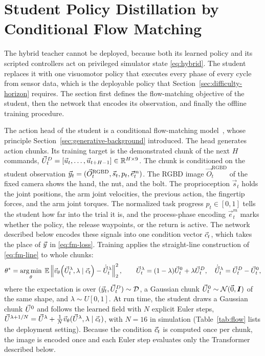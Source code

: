 \section{Student Policy Distillation by Conditional Flow Matching}\label{sec:distillation}

The hybrid teacher cannot be deployed, because both its learned policy and its scripted controllers act on privileged simulator state \eqref{eq:hybrid}. The student replaces it with one visuomotor policy that executes every phase of every cycle from sensor data, which is the deployable policy that Section~\ref{sec:difficulty-horizon} requires. The section first defines the flow-matching objective of the student, then the network that encodes its observation, and finally the offline training procedure.

The action head of the student is a conditional flow-matching model~\cite{Lipman2023,Lipman2024}, whose principle Section~\ref{sec:generative-background} introduced.
The head generates action chunks. Its training target is the demonstrated chunk of the next $H$ commands, $\vec{U}^{D}_t=[\vec{u}_t,\dots,\vec{u}_{t+H-1}]\in\mathbb{R}^{H\times9}$. The chunk is conditioned on the student observation $\vec{y}_t=(\vec{O}^{\mathrm{RGBD}}_t,\vec{s}_t,p_t,\vec{e}^{m}_t)$. The \acs{RGBD} image $\vec{O}^{\mathrm{RGBD}}_t$ of the fixed camera shows the hand, the nut, and the bolt. The proprioception $\vec{s}_t$ holds the joint positions, the arm joint velocities, the previous action, the fingertip forces, and the arm joint torques. The normalized task progress $p_t\in[0,1]$ tells the student how far into the trial it is, and the process-phase encoding $\vec{e}^{m}_t$ marks whether the policy, the release waypoints, or the return is active. The network described below encodes these signals into one condition vector $\vec{c}_t$, which takes the place of $\vec{y}$ in \eqref{eq:fm-loss}. Training applies the straight-line construction of \eqref{eq:fm-line} to whole chunks:
\begin{equation}\label{eq:student-objective}
  \theta^{*}=\argmin_\theta\;\E\left\|\vfield\!\left(\Uc^{\lambda}_t,\lambda\mid\cond_t\right)-\dot{\Uc}^{\lambda}_t\right\|_2^{2},\qquad
  \Uc^{\lambda}_t=(1-\lambda)\Uc^{0}_t+\lambda\Uc^{D}_t,\quad
  \dot{\Uc}^{\lambda}_t=\Uc^{D}_t-\Uc^{0}_t,
\end{equation}
where the expectation is over $(\vec{y}_t,\vec{U}^{D}_t)\sim\mathcal{D}$, a Gaussian chunk $\vec{U}^{0}_t\sim\mathcal{N}(\vec{0},\boldsymbol{I})$ of the same shape, and $\lambda\sim U[0,1]$. At run time, the student draws a Gaussian chunk $\vec{U}^{0}$ and follows the learned field with $N$ explicit Euler steps, $\vec{U}^{\lambda+1/N}=\vec{U}^{\lambda}+\frac{1}{N}\vec{v}_{\theta}(\vec{U}^{\lambda},\lambda\mid\vec{c}_t)$, with $N=16$ in simulation (Table~\ref{tab:flow} lists the deployment setting). Because the condition $\vec{c}_t$ is computed once per chunk, the image is encoded once and each Euler step evaluates only the Transformer described below.

